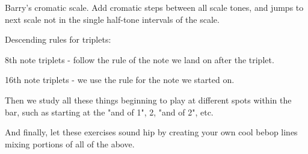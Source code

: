 \documentclass[a4paper,10pt,english]{article}
\begin{document}
\begin{todolist}
\begin{todolist}
    \end{todolist}
    \item Barry's cromatic scale. Add cromatic steps between all scale tones, and jumps to next scale not in the single half-tone intervals of the scale. 
    \item Descending rules for triplets:
    \begin{todolist}
    \item 8th note triplets - follow the rule of the note we land on after the triplet.
    \item 16th note triplets - we use the rule for the note we started on.
    \end{todolist}
    \item Then we study all these things beginning to play at different spots within the bar, such as starting at the "and of 1", 2, "and of 2", etc.
    \item And finally, let these exercises sound hip by creating your own cool bebop lines mixing portions of all of the above.
  \end{todolist}
\end{document}

